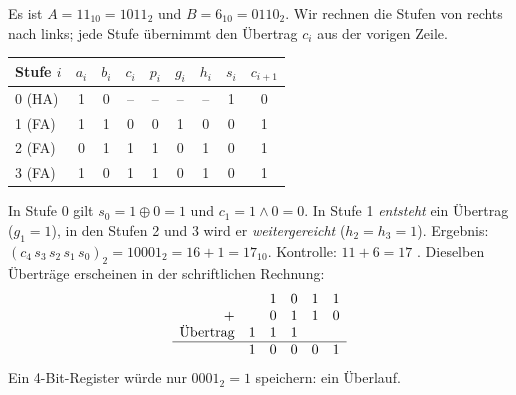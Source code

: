\begin{myexample}
    Es ist $A = 11_{10} = 1011_2$ und $B = 6_{10} = 0110_2$. Wir rechnen die Stufen von rechts nach links; jede Stufe übernimmt den Übertrag $c_i$ aus der vorigen Zeile.
    \begin{center}
        \begin{tabular}{lcccccccc}
            Stufe $i$ & $a_i$ & $b_i$ & $c_i$ & $p_i$ & $g_i$ & $h_i$ & $s_i$ & $c_{i+1}$ \\ \midrule
            0 (HA)    & 1     & 0     & --    & --    & --    & --    & 1     & 0         \\
            1 (FA)    & 1     & 1     & 0     & 0     & 1     & 0     & 0     & 1         \\
            2 (FA)    & 0     & 1     & 1     & 1     & 0     & 1     & 0     & 1         \\
            3 (FA)    & 1     & 0     & 1     & 1     & 0     & 1     & 0     & 1         \\
        \end{tabular}
    \end{center}
    In Stufe 0 gilt $s_0 = 1 \oplus 0 = 1$ und $c_1 = 1 \land 0 = 0$. In Stufe 1 \emph{entsteht} ein Übertrag ($g_1 = 1$), in den Stufen 2 und 3 wird er \emph{weitergereicht} ($h_2 = h_3 = 1$).
    Ergebnis: $(c_4\,s_3\,s_2\,s_1\,s_0)_2 = 10001_2 = 16 + 1 = 17_{10}$. Kontrolle: $11 + 6 = 17$ \checkmark. Dieselben Überträge erscheinen in der schriftlichen Rechnung:
    \[
        \begin{array}{rccccc}
                            &   & 1 & 0 & 1 & 1 \\
            +               &   & 0 & 1 & 1 & 0 \\
            \text{Übertrag} & 1 & 1 & 1 &   &   \\\hline
                            & 1 & 0 & 0 & 0 & 1
        \end{array}
    \]
    Ein 4-Bit-Register würde nur $0001_2 = 1$ speichern: ein Überlauf.
\end{myexample}

